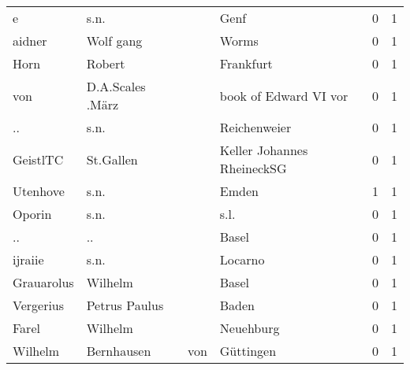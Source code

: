 \begin{tabular}{llllrr}
                        e &                               s.n. &             &                                        Genf &          0 &         1 \\
                   aidner &                          Wolf gang &             &                                       Worms &          0 &         1 \\
                     Horn &                             Robert &             &                                   Frankfurt &          0 &         1 \\
                      von &                   D.A.Scales .März &             &                       book of Edward VI vor &          0 &         1 \\
                       .. &                               s.n. &             &                                Reichenweier &          0 &         1 \\
                 GeistlTC &                          St.Gallen &             &                  Keller Johannes RheineckSG &          0 &         1 \\
                 Utenhove &                               s.n. &             &                                       Emden &          1 &         1 \\
                   Oporin &                               s.n. &             &                                        s.l. &          0 &         1 \\
                       .. &                                 .. &             &                                       Basel &          0 &         1 \\
                  ijraiie &                               s.n. &             &                                     Locarno &          0 &         1 \\
               Grauarolus &                            Wilhelm &             &                                       Basel &          0 &         1 \\
                Vergerius &                      Petrus Paulus &             &                                       Baden &          0 &         1 \\
                    Farel &                            Wilhelm &             &                                   Neuehburg &          0 &         1 \\
                  Wilhelm &                         Bernhausen &         von &                                   Güttingen &          0 &         1 \\

\end{tabular}
